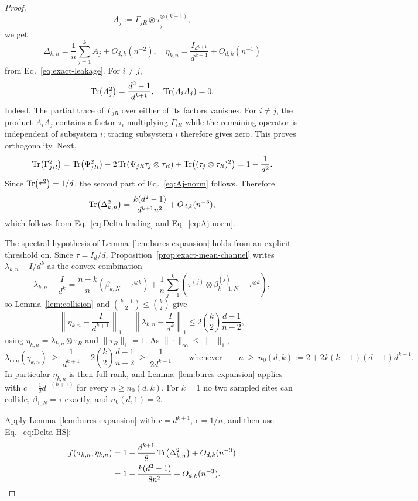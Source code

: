 \documentclass[11pt,letterpaper]{article}
\theoremstyle{plain}
\theoremstyle{plain}
\theoremstyle{plain}
\theoremstyle{plain}
\theoremstyle{plain}
\theoremstyle{plain}
\theoremstyle{plain}
\theoremstyle{definition}
\theoremstyle{plain}
\begin{document}
\begin{proof}
\begin{equation}
\label{eq:Aj}
  A_j:=\Gamma_{jR}\otimes\tau_{\widehat j}^{\otimes(k-1)},
\end{equation}
we get
 \begin{equation}
\label{eq:Delta-leading}
  \Delta_{k,n}=\frac1n\sum_{j=1}^kA_j+O_{d,k}(n^{-2}), \quad \eta_{k,n}=\frac{I_{d^{k+1}}}{d^{k+1}}+O_{d,k}(n^{-1})
\end{equation}
from Eq.~\eqref{eq:exact-leakage}.
For $i\ne j$,
\begin{equation}
\label{eq:Aj-norm}
  \Tr(A_j^2)=\frac{d^2-1}{d^{k+1}}, \quad \Tr(A_iA_j)=0.
\end{equation}
Indeed, The partial trace of $\Gamma_{jR}$ over either of its factors vanishes. 
For $i\ne j$, the product $A_iA_j$ contains a factor $\tau_i$ multiplying $\Gamma_{iR}$ while the remaining operator is independent of subsystem $i$; 
tracing subsystem $i$ therefore gives zero. This proves orthogonality.
Next,
\[
  \Tr(\Gamma_{jR}^2)
  =\Tr(\Psi_{jR}^2)
   -2\Tr(\Psi_{jR}\tau_j\otimes\tau_R)
   +\Tr((\tau_j\otimes\tau_R)^2)
  =1-\frac1{d^2}.
\]
Since $\Tr(\tau^2)=1/d$, the second part of Eq.~\eqref{eq:Aj-norm} follows. Therefore
\begin{equation}
\label{eq:Delta-HS}
  \Tr(\Delta_{k,n}^2)
  =\frac{k(d^2-1)}{d^{k+1}n^2}+O_{d,k}(n^{-3}),
\end{equation}
which follows from Eq.~\eqref{eq:Delta-leading} and Eq.~\eqref{eq:Aj-norm}.

The spectral hypothesis of Lemma~\ref{lem:bures-expansion} holds from an explicit threshold on. Since $\tau=I_d/d$, 
Proposition~\ref{prop:exact-mean-channel} writes $\lambda_{k,n}-I/d^k$ as the convex combination
\[
  \lambda_{k,n}-\frac{I}{d^k}
  =\frac{n-k}{n}\left(\beta_{k,N}-\tau^{\otimes k}\right)
   +\frac1n\sum_{j=1}^k\left(\tau^{(j)}\otimes\beta_{k-1,N}^{(\widehat j)}-\tau^{\otimes k}\right),
\]
so Lemma~\ref{lem:collision} and $\binom{k-1}2\le\binom k2$ give
\[
  \left\|\eta_{k,n}-\frac{I}{d^{k+1}}\right\|_1
  =\left\|\lambda_{k,n}-\frac{I}{d^k}\right\|_1
  \le 2\binom k2\frac{d-1}{n-2},
\]
using $\eta_{k,n}=\lambda_{k,n}\otimes\tau_R$ and $\|\tau_R\|_1=1$. As $\|\cdot\|_\infty\le\|\cdot\|_1$,
\[
  \lambda_{\min}(\eta_{k,n})
  \ \ge\ \frac{1}{d^{k+1}}-2\binom k2\frac{d-1}{n-2}
  \ \ge\ \frac{1}{2d^{k+1}}
  \qquad\text{whenever}\qquad
  n\ \ge\ n_0(d,k):=2+2k(k-1)(d-1)d^{k+1}.
\]
In particular $\eta_{k,n}$ is then full rank, and Lemma~\ref{lem:bures-expansion} applies with $c=\tfrac12 d^{-(k+1)}$ for every $n\ge n_0(d,k)$. For $k=1$ no two sampled sites can collide, $\beta_{1,N}=\tau$ exactly, and $n_0(d,1)=2$.

Apply Lemma~\ref{lem:bures-expansion} with $r=d^{k+1}$, $\epsilon=1/n$, and then use Eq.~\eqref{eq:Delta-HS}:
\begin{align*}
  f(\sigma_{k,n},\eta_{k,n})
  &=1-\frac{d^{k+1}}8\Tr(\Delta_{k,n}^2)
       +O_{d,k}(n^{-3})\\
  &=1-\frac{k(d^2-1)}{8n^2}+O_{d,k}(n^{-3}).
\end{align*}
\end{proof}
\end{document}
